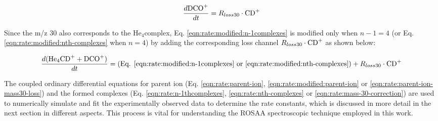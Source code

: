 \begin{equation}
    \frac{d\text{DCO}^+}{dt} = R_{loss30} \cdot \text{CD}^+
    \label{eqn:rate:mass-30-formation}
\end{equation}

Since the m/z 30 also corresponds to the He$_4$\CD complex, Eq.
\ref{eqn:rate:modified:n-1complexes} is modified only when $n-1=4$ (or Eq.
\ref{eqn:rate:modified:nth-complexes} when $n=4$) by adding the corresponding
loss channel \(R_{loss30} \cdot \text{CD}^+\) as shown below:

\begin{equation}
    \frac{d(\text{He}_4\text{CD}^+ + \text{DCO}^+)}{dt} = (\text{Eq. } \ref{eqn:rate:modified:n-1complexes} \text{ or } \ref{eqn:rate:modified:nth-complexes}) + R_{loss30} \cdot \text{CD}^+
    \label{eqn:rate:mass-30-correction}
\end{equation}

The coupled ordinary differential equations for parent ion \CD (Eq.
\ref{eqn:rate:parent-ion}, \ref{eqn:rate:modified:parent-ion} or
\ref{eqn:rate:parent-ion-mass30-loss}) and the formed complexes (Eq.
\ref{eqn:rate:n-1thcomplexes}, \ref{eqn:rate:nth-complexes} or
\ref{eqn:rate:mass-30-correction}) are used to numerically simulate and fit the
experimentally observed data to determine the rate constants, which is
discussed in more detail in the next section in different aspects. This process
is vital for understanding the ROSAA spectroscopic technique employed in this
work.